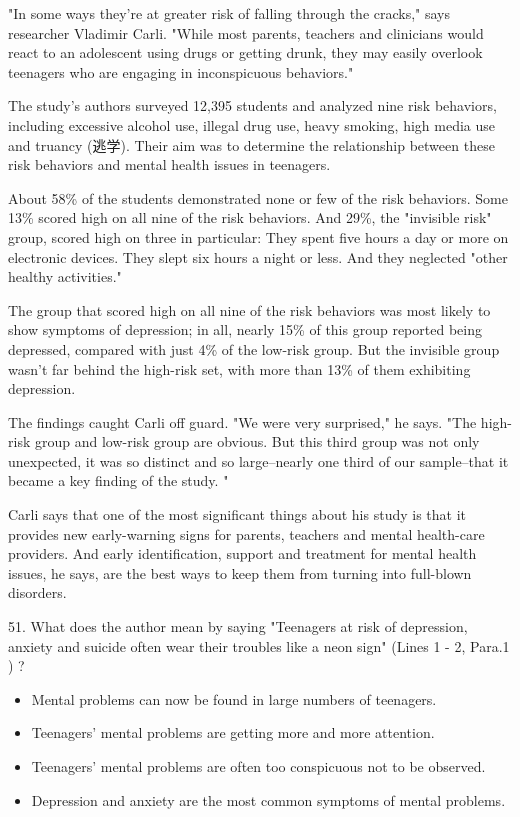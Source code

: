 \documentclass[UTF8,11pt]{ctexart}
\begin{document}
"In some ways they're at greater risk of falling through the cracks," says researcher Vladimir Carli. "While most parents, teachers and clinicians would react to an adolescent using drugs or getting drunk, they may easily overlook teenagers who are engaging in inconspicuous behaviors."


The study's authors surveyed 12,395 students and analyzed nine risk behaviors, including excessive alcohol use, illegal drug use, heavy smoking, high media use and truancy (逃学). Their aim was to determine the relationship between these risk behaviors and mental health issues in teenagers.


About 58\% of the students demonstrated none or few of the risk behaviors. Some 13\% scored high on all nine of the risk behaviors. And 29\%, the "invisible risk" group, scored high on three in particular: They spent five hours a day or more on electronic devices. They slept six hours a night or less. And they neglected "other healthy activities."


The group that scored high on all nine of the risk behaviors was most likely to show symptoms of depression; in all, nearly 15\% of this group reported being depressed, compared with just 4\% of the low-risk group. But the invisible group wasn't far behind the high-risk set, with more than 13\% of them exhibiting depression.


The findings caught Carli off guard. "We were very surprised," he says. "The high-risk group and low-risk group are obvious. But this third group was not only unexpected, it was so distinct and so large--nearly one third of our sample--that it became a key finding of the study. "


Carli says that one of the most significant things about his study is that it provides new early-warning signs for parents, teachers and mental health-care providers. And early identification, support and treatment for mental health issues, he says, are the best ways to keep them from turning into full-blown disorders.


51. What does the author mean by saying "Teenagers at risk of depression, anxiety and suicide often wear their troubles like a neon sign" (Lines 1 - 2, Para.1 ) ?


\begin{itemize}[leftmargin=2em,itemsep=.2em,topsep=.4em]\item[A.] Mental problems can now be found in large numbers of teenagers.
\item[B.] Teenagers' mental problems are getting more and more attention.
\item[C.] Teenagers' mental problems are often too conspicuous not to be observed.
\item[D.] Depression and anxiety are the most common symptoms of mental problems.
\end{itemize}
\end{document}
